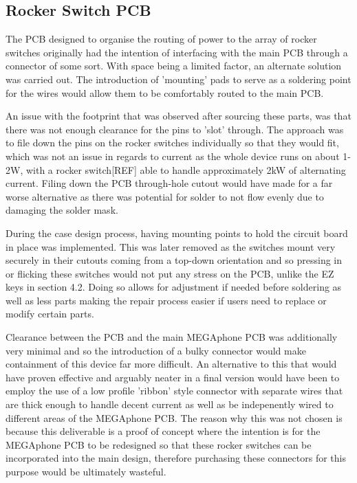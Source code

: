 \subsection{Rocker Switch PCB}

The PCB designed to organise the routing of power to the array of rocker switches originally had the intention of interfacing with the main PCB through a connector of some sort.
With space being a limited factor, an alternate solution was carried out.
The introduction of 'mounting' pads to serve as a soldering point for the wires would allow them to be comfortably routed to the main PCB.

An issue with the footprint that was observed after sourcing these parts, was that there was not enough clearance for the pins to 'slot' through.
The approach was to file down the pins on the rocker switches individually so that they would fit, which was not an issue in regards to current as the whole device runs on about 1-2W, with a rocker switch[REF] able to handle approximately 2kW of alternating current.
Filing down the PCB through-hole cutout would have made for a far worse alternative as there was potential for solder to not flow evenly due to damaging the solder mask. %

During the case design process, having mounting points to hold the circuit board in place was implemented.
This was later removed as the switches mount very securely in their cutouts coming from a top-down orientation and so pressing in or flicking these switches would not put any stress on the PCB, unlike the EZ keys in section 4.2.
Doing so allows for adjustment if needed before soldering as well as less parts making the repair process easier if users need to replace or modify certain parts.

Clearance between the PCB and the main MEGAphone PCB was additionally very minimal and so the introduction of a bulky connector would make containment of this device far more difficult.
An alternative to this that would have proven effective and arguably neater in a final version would have been to employ the use of a low profile 'ribbon' style connector with separate wires that are thick enough to handle decent current as well as be indepenently wired to different areas of the MEGAphone PCB.
The reason why this was not chosen is because this deliverable is a proof of concept where the intention is for the MEGAphone PCB to be redesigned so that these rocker switches can be incorporated into the main design, therefore purchasing these connectors for this purpose would be ultimately wasteful.

